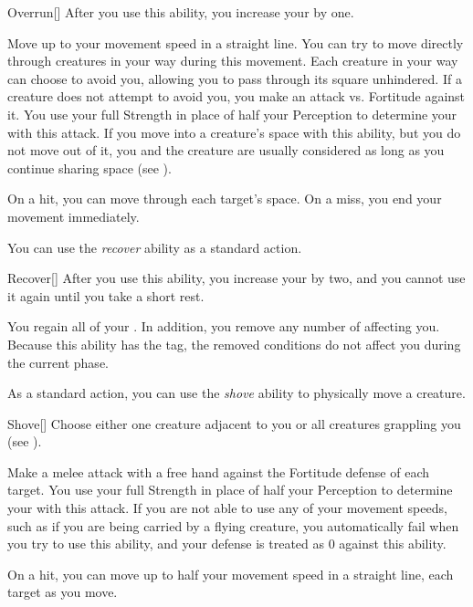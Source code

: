         \begin{activeability}{Overrun}[]
            \rankline
            After you use this ability, you increase your  by one.

            Move up to your movement speed in a straight line.
            You can try to move directly through creatures in your way during this movement.
            Each creature in your way can choose to avoid you, allowing you to pass through its square unhindered.
            If a creature does not attempt to avoid you, you make an attack vs. Fortitude against it.
            You use your full Strength in place of half your Perception to determine your  with this attack.
            If you move into a creature's space with this ability, but you do not move out of it, you and the creature are usually considered \squeezing as long as you continue sharing space (see ).

            On a hit, you can move through each target's space.
            On a miss, you end your movement immediately.
        \end{activeability}

        \label{Recover} You can use the \textit{recover} ability as a standard action.
        \begin{activeability}{Recover}[]
            \rankline
            After you use this ability, you increase your  by two, and you cannot use it again until you take a short rest.

            You regain all of your .
            In addition, you remove any number of  affecting you.
            Because this ability has the  tag, the removed conditions do not affect you during the current phase.
        \end{activeability}

        \label{Shove} As a standard action, you can use the \textit{shove} ability to physically move a creature.

        \begin{activeability}{Shove}[]
            \rankline
            Choose either one creature adjacent to you or all creatures grappling you (see ).

            Make a melee attack with a free hand against the Fortitude defense of each target.
            You use your full Strength in place of half your Perception to determine your  with this attack.
            If you are not able to use any of your movement speeds, such as if you are being carried by a flying creature, you automatically fail when you try to use this ability, and your defense is treated as 0 against this ability.

            On a hit, you can move up to half your movement speed in a straight line,  each target as you move.
        \end{activeability}

